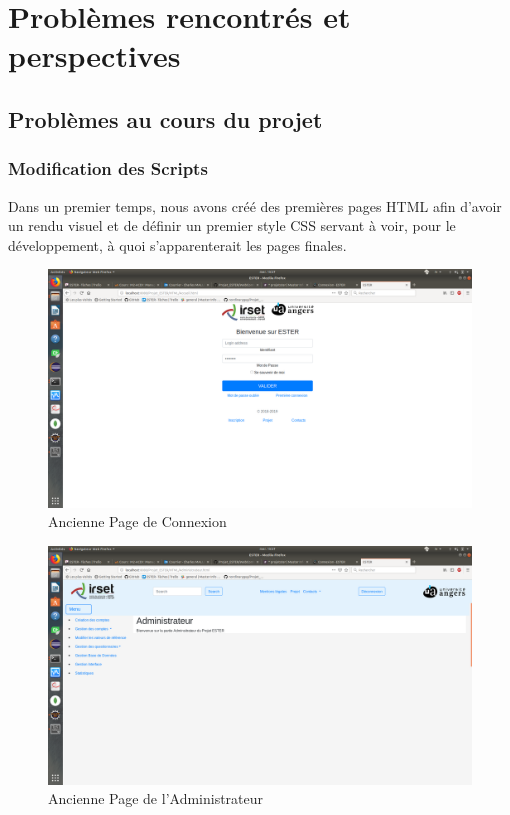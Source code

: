 \chapter{Problèmes rencontrés  et perspectives}

\section{Problèmes au cours du projet}

\subsection{Modification des Scripts}

Dans un premier temps, nous avons créé des premières pages HTML afin d'avoir un rendu visuel et de définir un premier style CSS servant à voir, pour le développement, à quoi s'apparenterait les pages finales.

\begin{figure}[H]
    \begin{center}
	\includegraphics[scale=0.2,trim=4cm 0cm 4cm 5.3cm, clip=true]{img/OldConnexion}
    \end{center}
    \caption{Ancienne Page de Connexion}
\end{figure}

\begin{figure}[H]
    \begin{center}
	\includegraphics[scale=0.2,trim=2.8cm 0cm 0.8cm 5.3cm, clip=true]{img/OldAdmin}
    \end{center}
    \caption{Ancienne Page de l'Administrateur}
\end{figure}

